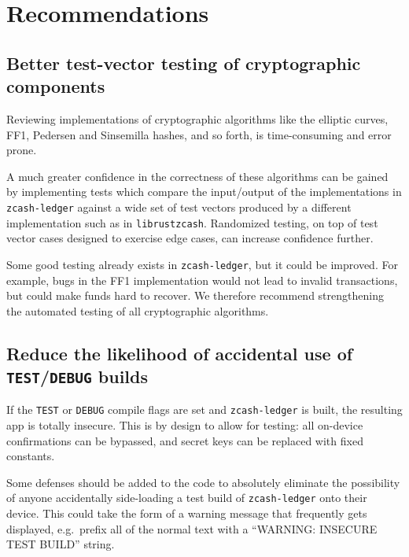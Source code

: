 \documentclass[10pt,titlepage]{article}
\begin{document}
\renewcommand{\thesubsection}{\thesection.\arabic{subsection}}
\section{Recommendations} \label{secrecommendations}

\subsection{Better test-vector testing of cryptographic components}

Reviewing implementations of cryptographic algorithms like the elliptic curves,
FF1, Pedersen and Sinsemilla hashes, and so forth, is time-consuming and error
prone. 

A much greater confidence in the correctness of these algorithms can be gained
by implementing tests which compare the input/output of the implementations in
\texttt{zcash-ledger} against a wide set of test vectors produced by a different
implementation such as in \texttt{librustzcash}. Randomized testing, on top of
test vector cases designed to exercise edge cases, can increase confidence further.

Some good testing already exists in \texttt{zcash-ledger}, but it could be
improved. For example, bugs in the FF1 implementation would not lead to invalid
transactions, but could make funds hard to recover. We therefore recommend
strengthening the automated testing of all cryptographic algorithms.

\subsection{Reduce the likelihood of accidental use of \texttt{TEST}/\texttt{DEBUG} builds}

If the \texttt{TEST} or \texttt{DEBUG} compile flags are set and
\texttt{zcash-ledger} is built, the resulting app is totally insecure. This is
by design to allow for testing: all on-device confirmations can be bypassed, and
secret keys can be replaced with fixed constants.

Some defenses should be added to the code to absolutely eliminate the
possibility of anyone accidentally side-loading a test build of
\texttt{zcash-ledger} onto their device. This could take the form of a warning
message that frequently gets displayed, e.g.\ prefix all of the normal text with
a ``WARNING: INSECURE TEST BUILD'' string.
\end{document}
